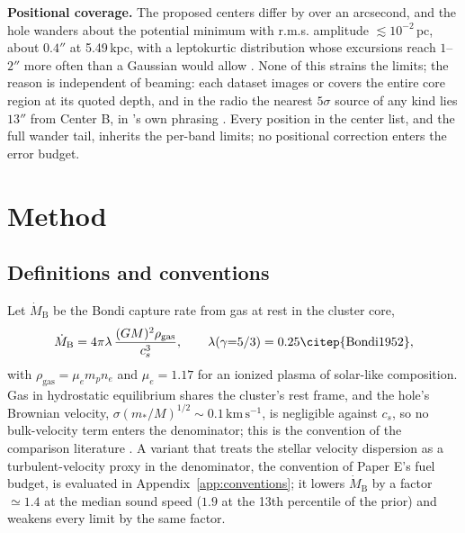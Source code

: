 \documentclass[11pt]{article}
\newcommand{\mdotB}{\ensuremath{\dot{M}_{\mathrm{B}}}}
\begin{document}
\textbf{Positional coverage.} The proposed centers \citep{vanderMarelAnderson2010,Noyola2008,Noyola2010} differ by over an arcsecond, and the hole wanders about the potential minimum with r.m.s. amplitude $\lesssim 10^{-2}$\,pc, about $0.4''$ at 5.49\,kpc, with a leptokurtic distribution whose excursions reach $1$--$2''$ more often than a Gaussian would allow \citep{DiCintio2023,ChatterjeeHernquistLoeb2002}. None of this strains the limits; the reason is independent of beaming: each dataset images or covers the entire core region at its quoted depth, and in the radio the nearest $5\sigma$ source of any kind lies $13''$ from Center B, in \citeauthor{Mahida2026}'s own phrasing \citep{Mahida2026}. Every position in the center list, and the full wander tail, inherits the per-band limits; no positional correction enters the error budget.
\section{Method}
\label{sec:method}

\subsection{Definitions and conventions}
\label{sec:defs}

Let $\mdotB$ be the Bondi capture rate from gas at rest in the cluster core,
\begin{equation}
\mdotB = 4\pi \lambda\,\frac{(GM)^{2}\rho_{\mathrm{gas}}}{c_{s}^{3}},
\qquad \lambda(\gamma{=}5/3) = 0.25 \text{\citep{Bondi1952}},
\label{eq:bondi}
\end{equation}
with $\rho_{\mathrm{gas}} = \mu_{e} m_{p} n_{e}$ and $\mu_{e} = 1.17$ for an ionized plasma of solar-like composition. Gas in hydrostatic equilibrium shares the cluster's rest frame, and the hole's Brownian velocity, $\sigma(m_{*}/M)^{1/2} \sim 0.1\,\mathrm{km\,s^{-1}}$, is negligible against $c_{s}$, so no bulk-velocity term enters the denominator; this is the convention of the comparison literature \citep{Strader2012,Tremou2018,Haggard2013}. A variant that treats the stellar velocity dispersion as a turbulent-velocity proxy in the denominator, the convention of Paper E's fuel budget, is evaluated in Appendix~\ref{app:conventions}; it lowers $\mdotB$ by a factor $\simeq 1.4$ at the median sound speed ($1.9$ at the 13th percentile of the prior) and weakens every limit by the same factor.
\end{document}
